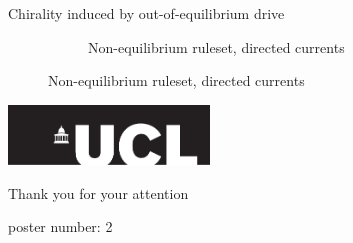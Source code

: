 \documentclass[10pt,mathserif]{beamer}
\begin{document}
\begin{frame}[fragile]{Chirality induced by out-of-equilibrium drive}
\begin{figure}
\begin{subfigure}{0.49\textwidth}
            \caption{
                Non-equilibrium ruleset, directed currents
            }
		\end{subfigure}
	\end{figure}
\end{frame}

\begin{frame}
	\begin{flushright}
		\includegraphics[width=0.4\textwidth]{figures/UCL_logo.pdf} \\
	\end{flushright}

	\vspace{2em}
	\begin{center}
		\LARGE
		Thank you for your attention
	\end{center}
	\normalsize
	\vspace{10.5em}

	\normalsize
	poster number: 2

	\vfill
\end{frame}
\end{document}
